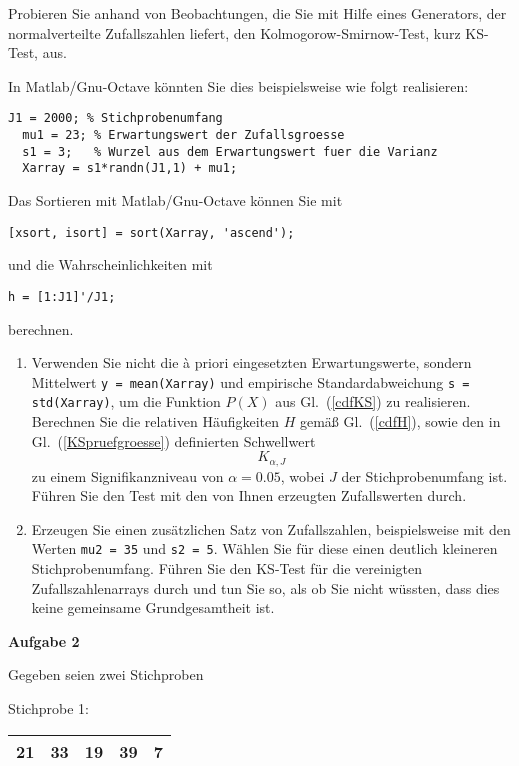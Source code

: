 Probieren Sie anhand von Beobachtungen, die Sie mit Hilfe eines Generators, der
normalverteilte Zufallszahlen liefert, den Kolmogorow-Smirnow-Test, kurz KS-Test, aus.

In Matlab/Gnu-Octave könnten Sie dies beispielsweise wie folgt realisieren:

\begin{lstlisting}[style=Matlab]
  J1 = 2000; % Stichprobenumfang
  mu1 = 23; % Erwartungswert der Zufallsgroesse
  s1 = 3;   % Wurzel aus dem Erwartungswert fuer die Varianz
  Xarray = s1*randn(J1,1) + mu1;
\end{lstlisting}
Das Sortieren mit Matlab/Gnu-Octave können Sie mit
\begin{lstlisting}[style=Matlab]
  [xsort, isort] = sort(Xarray, 'ascend');
\end{lstlisting}
und die Wahrscheinlichkeiten mit
\begin{lstlisting}[style=Matlab]
  h = [1:J1]'/J1;
\end{lstlisting}
berechnen.

\begin{enumerate}
\item Verwenden Sie nicht die {\`a} priori eingesetzten Erwartungswerte,
 sondern Mittelwert \texttt{y = mean(Xarray)} und empirische Standardabweichung
 \texttt{s = std(Xarray)}, um die Funktion $P(X)$ aus Gl.~(\ref{cdfKS})
 zu realisieren. Berechnen Sie die relativen Häufigkeiten $H$ gemäß
 Gl.~(\ref{cdfH}), sowie den in Gl.~(\ref{KSpruefgroesse}) definierten
 Schwellwert
  $$K_{\alpha, J}$$
 zu einem Signifikanzniveau von $\alpha = 0.05$,
 wobei $J$ der Stichprobenumfang ist.
 Führen Sie den Test mit den von Ihnen erzeugten Zufallswerten durch.
\item Erzeugen Sie einen zusätzlichen Satz von Zufallszahlen, beispielsweise mit den
 Werten \texttt{mu2 = 35} und \texttt{s2 = 5}. Wählen Sie für diese einen
 deutlich kleineren Stichprobenumfang. Führen Sie den KS-Test für die
 vereinigten Zufallszahlenarrays durch und tun Sie so, als ob Sie nicht
 wüssten, dass dies keine gemeinsame Grundgesamtheit ist.
\end{enumerate}



\textbf{Aufgabe 2}

Gegeben seien zwei Stichproben

Stichprobe 1:

\begin{tabular}{|c|c|c|c|c|}
\hline
21 & 33 & 19 & 39 & 7\\
\hline
\end{tabular}

